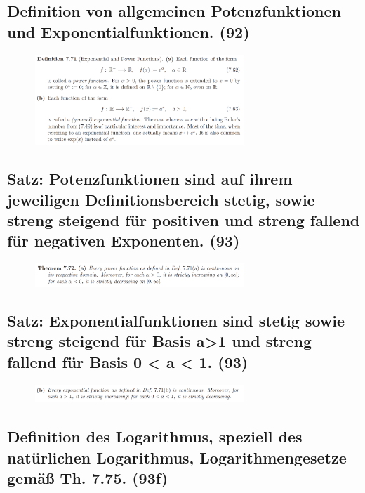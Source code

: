 \subsection{Definition von allgemeinen Potenzfunktionen und Exponentialfunktionen. (92)}

\begin{figure}[H] \centering
\includegraphics[width=0.7\textwidth]{media/7-26.png}
\end{figure}

\subsection{Satz: Potenzfunktionen sind auf ihrem jeweiligen Definitionsbereich stetig, sowie streng steigend für positiven und streng fallend für negativen Exponenten. (93)}

\begin{figure}[H] \centering
\includegraphics[width=0.7\textwidth]{media/7-27.png}
\end{figure}

\subsection{Satz: Exponentialfunktionen sind stetig sowie streng steigend für Basis a>1 und streng fallend für Basis 0 < a < 1. (93)}

\begin{figure}[H] \centering
\includegraphics[width=0.7\textwidth]{media/7-28.png}
\end{figure}

\subsection{Definition des Logarithmus, speziell des natürlichen Logarithmus, Logarithmengesetze gemäß Th. 7.75. (93f)}

